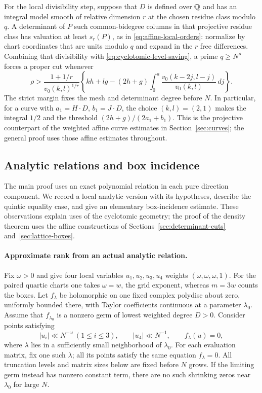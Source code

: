 For the local divisibility step, suppose that $D$ is defined over $\mathbb Q$
and has an integral model smooth of relative dimension $r$ at the
chosen residue class modulo $q$. A determinant of $P$ such
common-bidegree columns in that projective residue class has
valuation at least $s_r(P)$, as in
\eqref{eq:affine-local-orders}: normalize by chart coordinates that
are units modulo $q$ and expand in the $r$ free differences.
Combining that divisibility with
\eqref{eq:cyclotomic-level-saving}, a prime $q\ge N^\rho$ forces a
proper cut whenever
\begin{equation}\label{eq:cyclotomic-level-threshold}
 \rho>\frac{1+1/r}{v_0(k,l)^{1/r}}
 \left\{kh+lg-(2h+g)\int_0^a
       \frac{v_0(k-2j,l-j)}{v_0(k,l)}\,dj\right\}.
\end{equation}
The strict margin fixes the mesh and determinant degree before $N$.
In particular, for a curve with $a_1=H\cdot D$, $b_1=J\cdot D$,
the choice $(k,l)=(2,1)$ makes the integral $1/2$ and the threshold
$(2h+g)/(2a_1+b_1)$. This is the projective counterpart of the
weighted affine curve estimates in Section~\ref{sec:curves}; the
general proof uses those affine estimates throughout.

\subsection{Analytic relations and box incidence}

The main proof uses an exact polynomial relation in each pure direction
component. We record a local analytic version with its hypotheses,
describe the quintic equality case, and give an elementary box-incidence
estimate. These observations explain uses of the
cyclotomic geometry; the proof of
the density theorem uses the affine constructions of
Sections~\ref{sec:determinant-cuts} and~\ref{sec:lattice-boxes}.

\paragraph{Approximate rank from an actual analytic relation.}
Fix $\omega>0$ and give four local variables $u_1,u_2,u_3,u_4$ weights
$(\omega,\omega,\omega,1)$. For the paired quartic charts one takes
$\omega=w$, the grid exponent, whereas $m=3w$ counts the boxes.
Let $f_\lambda$ be holomorphic on one fixed complex polydisc about
zero, uniformly bounded there, with Taylor coefficients continuous at
a parameter $\lambda_0$. Assume that $f_{\lambda_0}$ is a nonzero germ
of lowest weighted degree $D>0$. Consider points satisfying
\[
 |u_i|\ll N^{-\omega}\ (1\le i\le3),\qquad
 |u_4|\ll N^{-1},\qquad f_\lambda(u)=0,
\]
where $\lambda$ lies in a sufficiently small neighborhood of
$\lambda_0$. For each evaluation matrix, fix one such $\lambda$;
all its points satisfy the same equation $f_\lambda=0$.
All truncation levels and matrix sizes below are fixed
before $N$ grows. If the limiting germ instead has nonzero constant
term, there are no such shrinking zeros near $\lambda_0$ for large $N$.

